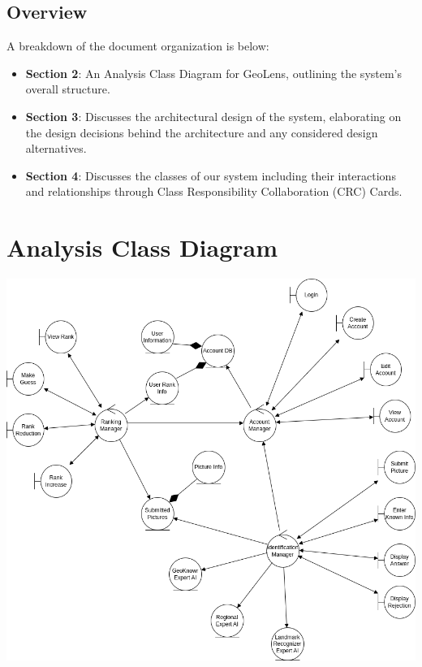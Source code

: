 \documentclass[]{article}
\begin{document}
\subsection{Overview}
\label{sub:overview}
A breakdown of the document organization is below:
\begin{itemize}
  \item \textbf{Section 2}: An Analysis Class Diagram for GeoLens, outlining the system’s overall structure.
  \item \textbf{Section 3}: Discusses the architectural design of the system, elaborating on the design decisions behind the architecture and any considered design alternatives.
  \item \textbf{Section 4}: Discusses the classes of our system including their interactions and relationships through Class Responsibility Collaboration (CRC) Cards.
\end{itemize}



\section{Analysis Class Diagram}
\label{sec:analysis_class_diagram}
\includegraphics[scale=0.5]{analysis_class_diagram}
\end{document}
